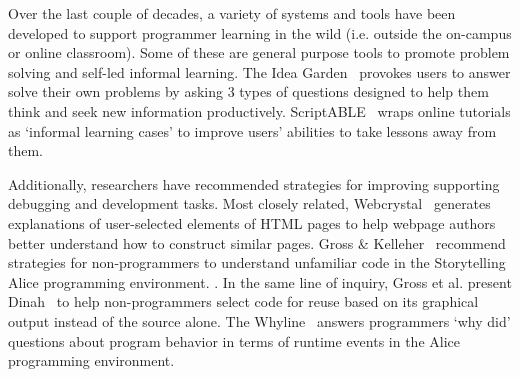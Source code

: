 Over the last couple of decades, a variety of systems and tools have been developed to support programmer learning in the wild
(i.e. outside the on-campus or online classroom).
Some of these are general purpose tools to promote problem solving and self-led informal learning.
The Idea Garden~\cite{cao_barriers_2012}\cite{cao_end-user_2013} provokes users to answer solve their own problems by asking 3 types of questions designed to help them think and seek new information productively.
ScriptABLE~\cite{dorn_scriptable_2011} wraps online tutorials as `informal learning cases' to improve users' abilities to take lessons away from them. 

Additionally, researchers have recommended strategies for improving supporting debugging and development tasks.
Most closely related, Webcrystal~\cite{chang_webcrystal_2012} generates explanations of user-selected elements of HTML pages to help webpage authors better understand how to construct similar pages.
Gross \& Kelleher~\cite{gross_non-programmers_2010} recommend strategies for non-programmers to understand unfamiliar code in the Storytelling Alice programming environment.
.
In the same line of inquiry, Gross et al. present Dinah~\cite{gross_dinah_2011} to help non-programmers select code for reuse based on its graphical output instead of the source alone.
The Whyline~\cite{ko_designing_2004} answers programmers `why did' questions about program behavior in terms of runtime events in the Alice programming environment.
